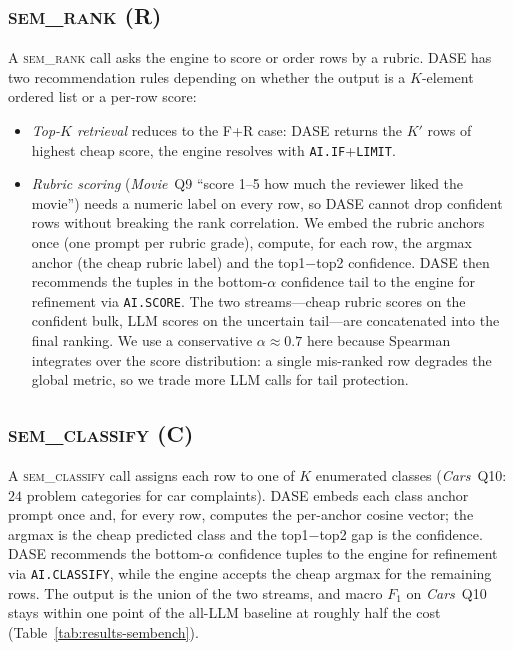 \subsection{\textsc{sem\_rank} (R)}

A \textsc{sem\_rank} call asks the engine to score or order rows by a
rubric. DASE has two recommendation rules depending on whether the
output is a $K$-element ordered list or a per-row score:
\begin{itemize}
\item \emph{Top-$K$ retrieval} reduces to the F+R case: DASE returns
  the $K'$ rows of highest cheap score, the engine resolves with
  \texttt{AI.IF}+\texttt{LIMIT}.
\item \emph{Rubric scoring} (\emph{Movie}~Q9 ``score 1--5 how much the
  reviewer liked the movie'') needs a numeric label on every row, so
  DASE cannot drop confident rows without breaking the rank
  correlation. We embed the rubric anchors once (one prompt per
  rubric grade), compute, for each row, the argmax anchor (the cheap
  rubric label) and the top1${-}$top2 confidence. DASE then recommends
  the tuples in the bottom-$\alpha$ confidence tail to the engine for
  refinement via \texttt{AI.SCORE}. The two streams---cheap rubric
  scores on the confident bulk, LLM scores on the uncertain
  tail---are concatenated into the final ranking. We use a
  conservative $\alpha\!\approx\!0.7$ here because Spearman integrates
  over the score distribution: a single mis-ranked row degrades the
  global metric, so we trade more LLM calls for tail protection.
\end{itemize}

\subsection{\textsc{sem\_classify} (C)}

A \textsc{sem\_classify} call assigns each row to one of $K$ enumerated
classes (\emph{Cars}~Q10: $24$ problem categories for car complaints).
DASE embeds each class anchor prompt once and, for every row, computes
the per-anchor cosine vector; the argmax is the cheap predicted class
and the top1${-}$top2 gap is the confidence. DASE recommends the
bottom-$\alpha$ confidence tuples to the engine for refinement via
\texttt{AI.CLASSIFY}, while the engine accepts the cheap argmax for the
remaining rows. The output is the union of the two streams, and macro
$F_1$ on \emph{Cars}~Q10 stays within one point of the all-LLM baseline
at roughly half the cost (Table~\ref{tab:results-sembench}).

